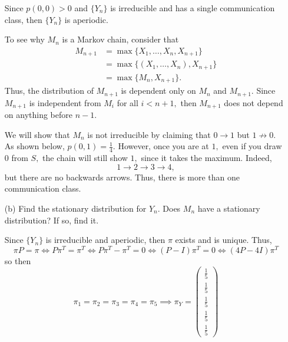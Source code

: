 \documentclass[11pt]{article}
\begin{document}
\begin{enumerate}
\begin{solution}
    Since $p(0,0) > 0$ and $\{Y_n\}$ is irreducible and has a single communication class, then $\{Y_n\}$ is aperiodic. 

    To see why $M_n$ is a Markov chain, consider that 
    \begin{align*}
        M_{n+1} &= \max\{X_1, \dots, X_{n}, X_{n+1}\}\\
        &= \max\{(X_1, \dots, X_{n}), X_{n+1}\}\\
        &= \max\{M_n, X_{n+1}\}.
    \end{align*}
    Thus, the distribution of $M_{n+1}$ is dependent only on $M_n$ and $M_{n+1}.$ Since $M_{n+1}$ is independent from $M_{i}$ for all $i< n+1,$ then $M_{n+1}$ does not depend on anything before $n-1.$ 

    We will show that $M_n$ is not irreducible by claiming that $0 \to 1$ but $1\not \to 0.$ As shown below, $p(0,1) = \frac{1}{4}.$ However, once you are at $1,$ even if you draw $0$ from $S,$ the chain will still show $1,$ since it takes the maximum. Indeed, 
    \[1\to 2\to 3\to 4,\] but there are no backwards arrows. Thus, there is more than one communication class.
    
\end{solution}

    \item[(b)] Find the stationary distribution for $Y_n$. Does $M_n$ have a stationary distribution? If so, find it.
\begin{solution}
    Since $\{Y_n\}$ is irreducible and aperiodic, then $\pi$ exists and is unique. Thus, 
    \[\pi P = \pi \iff P \pi^T = \pi^T \iff P\pi^T - \pi^T = 0 \iff (P - I)\pi^T = 0 \iff (4P - 4I)\pi^T\]
    so then 
    \[\pi_1 = \pi_2 = \pi_3 = \pi_4 = \pi_5 \implies \boxed{\pi_Y = \begin{pmatrix}
        \frac{1}{5}\\
        \frac{1}{5}\\  
        \frac{1}{5}\\
        \frac{1}{5}\\
        \frac{1}{5}
    \end{pmatrix}}\]


\end{solution}
\end{enumerate}
\end{document}
